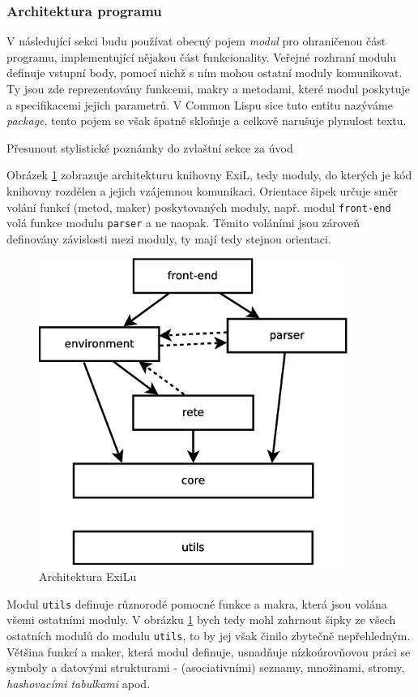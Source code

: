 \subsubsection{Architektura programu}

V následující sekci budu používat obecný pojem \emph{modul} pro ohraničenou část
programu, implementující nějakou část funkcionality. Veřejné rozhraní modulu
definuje vstupní body, pomocí nichž s ním mohou ostatní moduly komunikovat.
Ty jsou zde reprezentovány funkcemi, makry a metodami, které modul poskytuje
a specifikacemi jejich parametrů. V Common Lispu sice tuto entitu nazýváme
\emph{package}, tento pojem se však špatně skloňuje a celkově narušuje plynulost
textu.

\begin{framed}
  Přesunout stylistické poznámky do zvlaštní sekce za úvod
\end{framed}

Obrázek \ref{modules} zobrazuje architekturu knihovny ExiL, tedy moduly, do
kterých je kód knihovny rozdělen a jejich vzájemnou komunikaci. Orientace šipek
určuje směr volání funkcí (metod, maker) poskytovaných moduly, např. modul
\verb|front-end| volá funkce modulu \verb|parser| a ne naopak. Těmito voláními
jsou zároveň definovány závislosti mezi moduly, ty mají tedy stejnou orientaci.

\begin{figure}[h]
\centering
\includegraphics[height=10cm]{modules.eps}
\caption{Architektura ExiLu}
\label{modules}
\end{figure}

Modul \verb|utils| definuje různorodé pomocné funkce a makra, která jsou volána
všemi ostatními moduly. V obrázku \ref{modules} bych tedy mohl zahrnout šipky ze
všech ostatních modulů do modulu \verb|utils|, to by jej však činilo zbytečně
nepřehledným. Většina funkcí a maker, která modul definuje, usnadňuje
nízkoúrovňovou práci se symboly a datovými strukturami - (asociativními)
seznamy, množinami, stromy, \emph{hashovacími tabulkami} apod.

